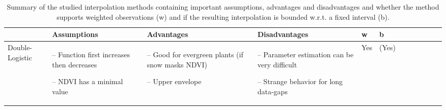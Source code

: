 \begin{table}[!ht]
	\centering
	\caption[Summary of the studied interpolation methods.]{Summary of the studied interpolation methods containing important assumptions, advantages and disadvantages and whether the method supports weighted observations (w) and if the resulting interpolation is bounded w.r.t. a fixed interval (b).}
	\small
	\begin{tabular}{p{1.6cm}p{3.3cm}p{3.3cm}p{3.4cm}p{0.4cm}p{0.4cm}p{3cm}p{3cm}p{3cm}p{3cm}p{2.7cm}p{3cm}|}
		\toprule
		~                                                                                                                                                            &
		\textbf{Assumptions}                                                                                                                                         &
		\textbf{Advantages}                                                                                                                                                &
		\textbf{Disadvantages}                                                                                                                                                &
		\textbf{w}                                                                                                                                      &
		\textbf{b}                                                                                                                                        \\ \hline

		Double-Logistic                                                                                                                                              &
		\begin{cptitemize} \item[--]  Function first increases then decreases \item[--]  NDVI has a minimal value                       \end{cptitemize}        &
		\begin{cptitemize} \item[--]  Good for evergreen plants (if snow masks NDVI) \item[--]  Upper envelope                                \end{cptitemize}        &
		\begin{cptitemize} \item[--]  Parameter estimation can be very difficult \item[--]  Strange behavior for long data-gaps             \end{cptitemize}        &
		Yes                                                                                                                                                          &
		(Yes)                                                                                                                                                         \\ \hline%


\end{tabular}
\end{table}
